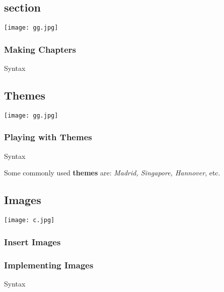 \documentclass{beamer}
\begin{document}
            \subsection{section}
            {\texttt{[image: gg.jpg]}}
                \begin{frame}[shrink]
                \frametitle{Making Chapters}
                \transwipe
                    \begin{block}{Syntax}
                        
                    \end{block}
                \end{frame}

            \subsection{Themes}
            {\texttt{[image: gg.jpg]}}
                \begin{frame}[shrink]
                \frametitle{Playing with Themes}
                \transboxout
                    \begin{block}{Syntax}
                        
                    \end{block}
                   {\color{white}Some commonly used \textbf{themes} are: \textit{Madrid, Singapore, Hannover}, etc.}
                \end{frame}

            \subsection{Images}
            {\texttt{[image: c.jpg]}}
            \subsubsection{Insert Images}
                \begin{frame}[shrink]
                \frametitle{Implementing Images}
                \transboxin
                    \begin{block}{Syntax}
                        
                    \end{block}
                \end{frame}
\end{document}
